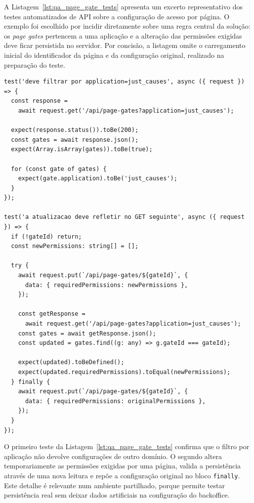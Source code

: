 A Listagem~\ref{lst:qa_page_gate_tests} apresenta um excerto representativo dos testes automatizados de \gls{API} sobre a configuração de acesso por página. O exemplo foi escolhido por incidir diretamente sobre uma regra central da solução: os \textit{page gates} pertencem a uma aplicação e a alteração das permissões exigidas deve ficar persistida no servidor. Por concisão, a listagem omite o carregamento inicial do identificador da página e da configuração original, realizado na preparação do teste.

\begin{lstlisting}[float, caption={Excerto de testes automatizados sobre configuração de acesso por página}, label={lst:qa_page_gate_tests}]
test('deve filtrar por application=just_causes', async ({ request }) => {
  const response =
    await request.get('/api/page-gates?application=just_causes');

  expect(response.status()).toBe(200);
  const gates = await response.json();
  expect(Array.isArray(gates)).toBe(true);

  for (const gate of gates) {
    expect(gate.application).toBe('just_causes');
  }
});

test('a atualizacao deve refletir no GET seguinte', async ({ request }) => {
  if (!gateId) return;
  const newPermissions: string[] = [];

  try {
    await request.put(`/api/page-gates/${gateId}`, {
      data: { requiredPermissions: newPermissions },
    });

    const getResponse =
      await request.get('/api/page-gates?application=just_causes');
    const gates = await getResponse.json();
    const updated = gates.find((g: any) => g.gateId === gateId);

    expect(updated).toBeDefined();
    expect(updated.requiredPermissions).toEqual(newPermissions);
  } finally {
    await request.put(`/api/page-gates/${gateId}`, {
      data: { requiredPermissions: originalPermissions },
    });
  }
});
\end{lstlisting}

O primeiro teste da Listagem~\ref{lst:qa_page_gate_tests} confirma que o filtro por aplicação não devolve configurações de outro domínio. O segundo altera temporariamente as permissões exigidas por uma página, valida a persistência através de uma nova leitura e repõe a configuração original no bloco \texttt{finally}. Este detalhe é relevante num ambiente partilhado, porque permite testar persistência real sem deixar dados artificiais na configuração do backoffice.

